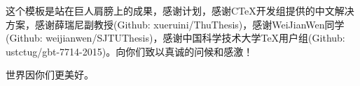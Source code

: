 这个模板是站在巨人肩膀上的成果，感谢\LaTeXe{}计划，感谢CTeX开发组提供的中文解决方案，感谢薛瑞尼副教授(Github: xueruini/ThuThesis)，感谢WeiJianWen同学(Github: weijianwen/SJTUThesis)，感谢中国科学技术大学TeX用户组(Github: ustctug/gbt-7714-2015)。向你们致以真诚的问候和感激！

世界因你们更美好。
